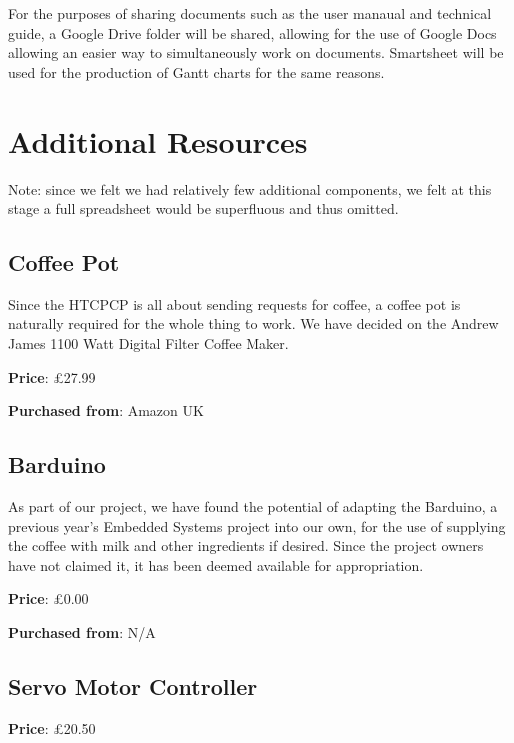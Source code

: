\documentclass[11pt, a4paper]{article}
\begin{document}
For the purposes of sharing documents such as the user manaual and technical
guide, a Google Drive folder will be shared, allowing for the use of Google Docs
allowing an easier way to simultaneously work on documents. Smartsheet will be
used for the production of Gantt charts for the same reasons.


\section{Additional Resources}
Note: since we felt we had relatively few additional components, we felt at this
stage a full spreadsheet would be superfluous and thus omitted.


\subsection{Coffee Pot}
Since the HTCPCP is all about sending requests for coffee, a coffee pot is
naturally required for the whole thing to work. We have decided on the Andrew
James 1100 Watt Digital Filter Coffee Maker.

\textbf{Price}: £27.99

\textbf{Purchased from}: Amazon UK


\subsection{Barduino}
As part of our project, we have found the potential of adapting the Barduino, a
previous year’s Embedded Systems project into our own, for the use of supplying
the coffee with milk and other ingredients if desired. Since the project owners
have not claimed it, it has been deemed available for appropriation.

\textbf{Price}: £0.00

\textbf{Purchased from}: N/A


\subsection{Servo Motor Controller}
\textbf{Price}: £20.50
\end{document}
